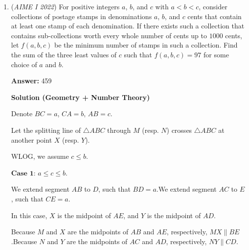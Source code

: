 \begin{enumerate}
 Similar explanations can be said when the solution divides 9999 by 11, 101, and uses that divided result in the PIE calculation rather than 9999.

 \textbf{mathboy282}

 


 \textbf{Sketch of Constuctive Counting Solution} If anyone wants to write this up, basically I thought to do:
 \[ \sum_{d\mid 9999}\varphi(d)=9999 \]and which is 9999 (identity), but then we must subtract all the numbers that show up multiple times in the numerator. We do this by doing casework on $n,$ like if $1111<n\leq3333$ we check how many n are coprime to 3333 in this range, giving the amount of n that show up multiple times in both $\frac{n}{3333}$ and $\frac{n}{9999}.$ repeat this bounding process and it should work.

 \href{https://MathProblemSolvingSkills.com}{https://MathProblemSolvingSkills.com}

 


	\item (\textit{AIME I 2022}) For positive integers $a$, $b$, and $c$ with $a < b < c$, consider collections of postage stamps in denominations $a$, $b$, and $c$ cents that contain at least one stamp of each denomination. If there exists such a collection that contains sub-collections worth every whole number of cents up to $1000$ cents, let $f(a, b, c)$ be the minimum number of stamps in such a collection. Find the sum of the three least values of $c$ such that $f(a, b, c) = 97$ for some choice of $a$ and $b$.


 
 \textbf{Answer: }459



\textbf{Solution (Geometry + Number Theory)}

Denote $BC = a$, $CA = b$, $AB = c$.

 Let the splitting line of $\triangle ABC$ through $M$ (resp. $N$) crosses $\triangle ABC$ at another point $X$ (resp. $Y$).

 WLOG, we assume $c \leq b$.

 $\textbf{Case 1}$: $a \leq c \leq b$.

 We extend segment $AB$ to $D$, such that $BD = a$.We extend segment $AC$ to $E$, such that $CE = a$.

 In this case, $X$ is the midpoint of $AE$, and $Y$ is the midpoint of $AD$.

 Because $M$ and $X$ are the midpoints of $AB$ and $AE$, respectively, $MX \parallel BE$.Because $N$ and $Y$ are the midpoints of $AC$ and $AD$, respectively, $NY \parallel CD$.


\end{enumerate}

